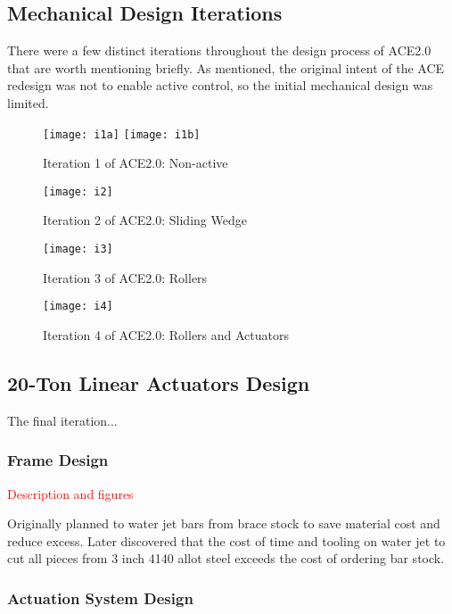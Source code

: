 \subsection{Mechanical Design Iterations}

There were a few distinct iterations throughout the design process of ACE2.0 that are worth mentioning briefly. As mentioned, the original intent of the ACE redesign was not to enable active control, so the initial mechanical design was limited. 

\begin{figure}[ht]
    \centering
    \texttt{[image: i1a]}
    \texttt{[image: i1b]}
    \caption{Iteration 1 of ACE2.0: Non-active}
    \label{fig:i1}
\end{figure}

\begin{figure}[ht]
    \centering
    \texttt{[image: i2]}
    \caption{Iteration 2 of ACE2.0: Sliding Wedge}
    \label{fig:i2}
\end{figure}

\begin{figure}[ht]
    \centering
    \texttt{[image: i3]}
    \caption{Iteration 3 of ACE2.0: Rollers}
    \label{fig:i3}
\end{figure}

\begin{figure}[ht]
    \centering
    \texttt{[image: i4]}
    \caption{Iteration 4 of ACE2.0: Rollers and Actuators}
    \label{fig:i4}
\end{figure}

\subsection{20-Ton Linear Actuators Design}

The final iteration...

\subsubsection{Frame Design}

\textcolor{red}{Description and figures}

Originally planned to water jet bars from brace stock to save material cost and reduce excess. Later discovered that the cost of time and tooling on water jet to cut all pieces from 3 inch 4140 allot steel exceeds the cost of ordering bar stock.

\subsubsection{Actuation System Design}

